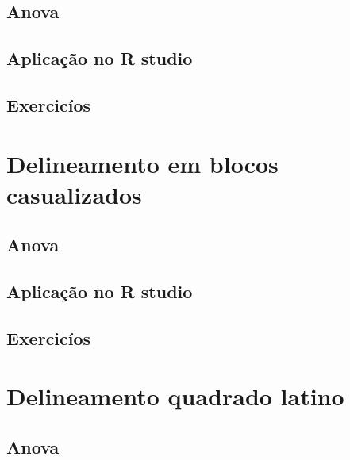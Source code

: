 \documentclass[
]{book}
\begin{document}
\hypertarget{anova}{%
\section{Anova}\label{anova}}

\hypertarget{aplicauxe7uxe3o-no-r-studio-8}{%
\section{Aplicação no R studio}\label{aplicauxe7uxe3o-no-r-studio-8}}

\hypertarget{exercicuxedos-8}{%
\section{Exercicíos}\label{exercicuxedos-8}}

\hypertarget{delineamento-em-blocos-casualizados}{%
\chapter{Delineamento em blocos casualizados}\label{delineamento-em-blocos-casualizados}}

\hypertarget{anova-1}{%
\section{Anova}\label{anova-1}}

\hypertarget{aplicauxe7uxe3o-no-r-studio-9}{%
\section{Aplicação no R studio}\label{aplicauxe7uxe3o-no-r-studio-9}}

\hypertarget{exercicuxedos-9}{%
\section{Exercicíos}\label{exercicuxedos-9}}

\hypertarget{delineamento-quadrado-latino}{%
\chapter{Delineamento quadrado latino}\label{delineamento-quadrado-latino}}

\hypertarget{anova-2}{%
\section{Anova}\label{anova-2}}
\end{document}

